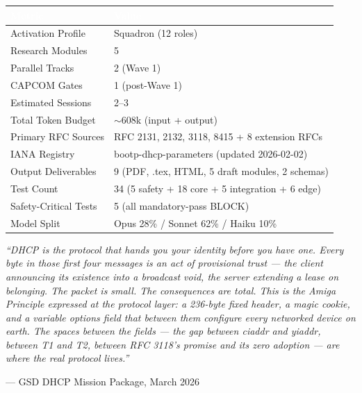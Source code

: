 \documentclass[11pt,letterpaper]{article}
\newcommand{\tableheader}[1]{\textbf{\sffamily\textcolor{white}{#1}}}
\begin{document}
\begin{center}
\begin{tabularx}{\textwidth}{L{4cm}X}
\toprule
{}
\tableheader{Metric} & \tableheader{Value} \\
\midrule
Activation Profile & Squadron (12 roles) \\
Research Modules & 5 \\
Parallel Tracks & 2 (Wave 1) \\
CAPCOM Gates & 1 (post-Wave 1) \\
Estimated Sessions & 2--3 \\
Total Token Budget & $\sim$608k (input + output) \\
Primary RFC Sources & RFC 2131, 2132, 3118, 8415 + 8 extension RFCs \\
IANA Registry & bootp-dhcp-parameters (updated 2026-02-02) \\
Output Deliverables & 9 (PDF, .tex, HTML, 5 draft modules, 2 schemas) \\
Test Count & 34 (5 safety + 18 core + 5 integration + 6 edge) \\
Safety-Critical Tests & 5 (all mandatory-pass BLOCK) \\
Model Split & Opus 28\% / Sonnet 62\% / Haiku 10\% \\
\bottomrule
\end{tabularx}
\end{center}

\vspace{2em}

\begin{quotebox}
\textit{``DHCP is the protocol that hands you your identity before you have one. Every byte in those first four messages is an act of provisional trust --- the client announcing its existence into a broadcast void, the server extending a lease on belonging. The packet is small. The consequences are total. This is the Amiga Principle expressed at the protocol layer: a 236-byte fixed header, a magic cookie, and a variable options field that between them configure every networked device on earth. The spaces between the fields --- the gap between ciaddr and yiaddr, between T1 and T2, between RFC 3118's promise and its zero adoption --- are where the real protocol lives.''}

\vspace{0.5em}
{\small\sffamily\textcolor{subtlegray}{--- GSD DHCP Mission Package, March 2026}}
\end{quotebox}
\end{document}
